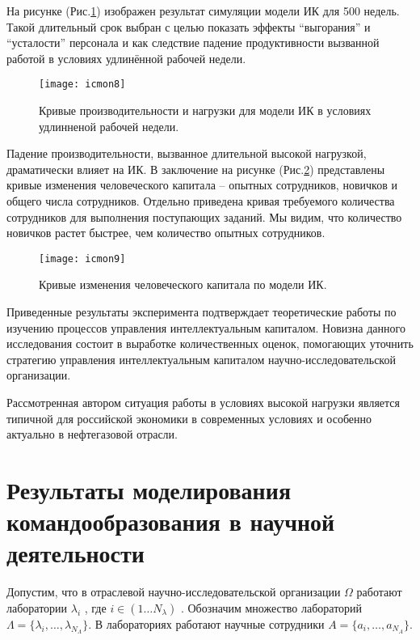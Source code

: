На рисунке (Рис.\ref{fig:icmon8})  изображен результат симуляции модели ИК для 500 недель. Такой длительный срок выбран с целью показать эффекты ``выгорания'' и ``усталости'' персонала и как следствие падение продуктивности вызванной работой в условиях удлинённой рабочей недели.

\begin{figure}[H]
  \caption{Кривые производительности и нагрузки для модели ИК в условиях удлинненой рабочей недели.}
  \centering
    \texttt{[image: icmon8]}
  \label{fig:icmon8}
\end{figure} 

Падение производительности, вызванное длительной высокой нагрузкой, драматически влияет на ИК. 
В заключение на рисунке (Рис.\ref{fig:icmon9}) представлены кривые изменения человеческого капитала – опытных сотрудников, новичков и общего числа сотрудников. Отдельно приведена кривая требуемого количества сотрудников для выполнения поступающих заданий. 
Мы видим, что количество новичков растет быстрее, чем количество опытных сотрудников.

\begin{figure}[H]
  \caption{Кривые изменения человеческого капитала по модели ИК.}
  \centering
    \texttt{[image: icmon9]}
  \label{fig:icmon9}
\end{figure} 

Приведенные результаты эксперимента подтверждает теоретические работы по изучению процессов управления интеллектуальным капиталом. 
Новизна данного исследования состоит в выработке количественных оценок, помогающих уточнить стратегию управления интеллектуальным капиталом научно-исследовательской организации. 

Рассмотренная автором ситуация работы в условиях высокой нагрузки является типичной для российской экономики в современных условиях и особенно актуально в нефтегазовой отрасли.

\section{Результаты моделирования командообразования в научной деятельности}
\label{sec:so}
Допустим, что в отраслевой научно-исследовательской организации $\Omega$  работают лаборатории $\lambda_i$ , где $i \in (1 \dots N_{\lambda})$ . 
Обозначим множество лабораторий $ \Lambda = \{ \lambda_i, \dots , \lambda_{N_{\Lambda}} \}$.
В лабораториях работают научные сотрудники $ A = \{ a_{i}, \dots, a_{N_A} \} $.  

